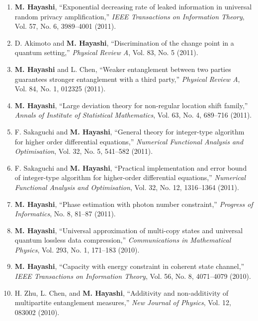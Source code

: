 \documentclass[a4paper,12pt,oneside]{article}
\begin{document}
\begin{enumerate}
\item   \textbf{M. Hayashi}, 
``Exponential decreasing rate of leaked information in universal random privacy amplification,'' 
{\em IEEE Transactions on Information Theory}, Vol. 57, No. 6, 3989--4001 (2011).

\item   D. Akimoto and \textbf{M. Hayashi}, 
``Discrimination of the change point in a quantum setting,''
{\em Physical Review A}, Vol. 83, No. 5 (2011).

\item   \textbf{M. Hayashi} and L. Chen, 
``Weaker entanglement between two parties guarantees stronger entanglement with a third party,'' 
{\em Physical Review A}, Vol. 84, No. 1, 012325 (2011). 

\item   \textbf{M. Hayashi}, 
``Large deviation theory for non-regular location shift family,''
{\em Annals of Institute of Statistical Mathematics}, Vol. 63, No. 4, 689--716 (2011).

\item   F. Sakaguchi and \textbf{M. Hayashi}, 
``General theory for integer-type algorithm for higher order differential equations,'' 
{\em Numerical Functional Analysis and Optimisation}, 
Vol. 32, No. 5, 541--582 (2011).

\item   
F. Sakaguchi and \textbf{M. Hayashi}, 
``Practical implementation and error bound of integer-type algorithm for higher-order differential equations,'' 
{\em Numerical Functional Analysis and Optimisation}, 
Vol. 32, No. 12, 1316--1364 (2011). 

\item   \textbf{M. Hayashi}, 
``Phase estimation with photon number constraint,'' 
{\em Progress of Informatics}, No. 8, 81--87 (2011).

\item   \textbf{M. Hayashi}, 
``Universal approximation of multi-copy states and universal quantum lossless data compression,'' 
{\em Communications in Mathematical Physics}, Vol. 293, No. 1, 171--183 (2010). 

\item   \textbf{M. Hayashi}, 
``Capacity with energy constraint in coherent state channel,'' 
{\em IEEE Transactions on Information Theory}, Vol. 56, No. 8, 4071--4079 (2010).

\item   H. Zhu, L. Chen, and \textbf{M. Hayashi}, 
``Additivity and non-additivity of multipartite entanglement measures,'' 
{\em New Journal of Physics}, Vol. 12, 083002 (2010). 


\end{enumerate}
\end{document}
